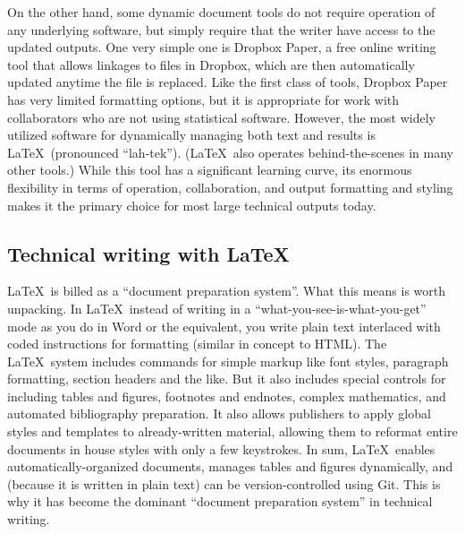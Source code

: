 On the other hand, some dynamic document tools do not require
operation of any underlying software, but simply require
that the writer have access to the updated outputs.
One very simple one is Dropbox Paper, a free online writing tool
that allows linkages to files in Dropbox,
which are then automatically updated anytime the file is replaced.
Like the first class of tools, Dropbox Paper has very limited formatting options,
but it is appropriate for work with collaborators who are not using statistical software.
However, the most widely utilized software
for dynamically managing both text and results is \LaTeX\ (pronounced ``lah-tek'').
  \index{\LaTeX}
(\LaTeX\ also operates behind-the-scenes in many other tools.)
While this tool has a significant learning curve,
its enormous flexibility in terms of operation, collaboration,
and output formatting and styling
makes it the primary choice for most large technical outputs today.

\subsection{Technical writing with \LaTeX}

\LaTeX\ is billed as a ``document preparation system''.
What this means is worth unpacking.
In \LaTeX\, instead of writing in a ``what-you-see-is-what-you-get'' mode
as you do in Word or the equivalent,
you write plain text interlaced with coded instructions for formatting
(similar in concept to HTML).
The \LaTeX\ system includes commands for simple markup
like font styles, paragraph formatting, section headers and the like.
But it also includes special controls for including tables and figures,
footnotes and endnotes, complex mathematics, and automated bibliography preparation.
It also allows publishers to apply global styles and templates
to already-written material, allowing them to reformat entire documents in house styles
with only a few keystrokes.
In sum, \LaTeX\ enables automatically-organized documents,
manages tables and figures dynamically,
and (because it is written in plain text) can be version-controlled using Git.
This is why it has become the dominant ``document preparation system'' in technical writing.

